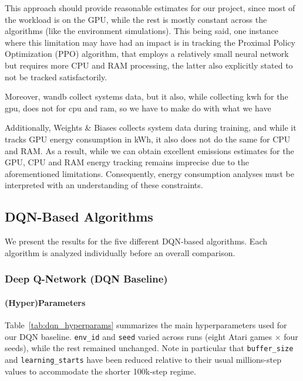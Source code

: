 This approach should provide reasonable estimates for our project, since most of the workload is on the GPU, while the rest is mostly constant across the algorithms (like the environment simulations). This being said, one instance where this limitation may have had an impact is in tracking the Proximal Policy Optimization (PPO) algorithm, that employs a relatively small neural network but requires more CPU and RAM processing, the latter also explicitly stated to not be tracked satisfactorily.

Moreover, wandb collect systems data, but it also, while collecting kwh for the gpu, does not for cpu and ram, so we have to make do with what we have

Additionally, Weights \& Biases collects system data during training, and while it tracks GPU energy consumption in kWh, it also does not do the same for CPU and RAM. As a result, while we can obtain excellent emissions estimates for the GPU, CPU and RAM energy tracking remains imprecise due to the aforementioned limitations. Consequently, energy consumption analyses must be interpreted with an understanding of these constraints.

\subsection{DQN-Based Algorithms}
We present the results for the five different DQN-based algorithms. Each algorithm is analyzed individually before an overall comparison.

\subsubsection{Deep Q-Network (DQN Baseline)}
\label{subsubsec:dqn_baseline}

\paragraph{(Hyper)Parameters}
Table~\ref{tab:dqn_hyperparams} summarizes the main hyperparameters used for our DQN baseline.  
\texttt{env\_id} and \texttt{seed} varied across runs (eight Atari games $\times$ four seeds), 
while the rest remained unchanged. Note in particular that \texttt{buffer\_size} and 
\texttt{learning\_starts} have been reduced relative to their usual millions-step values to 
accommodate the shorter 100k-step regime.

